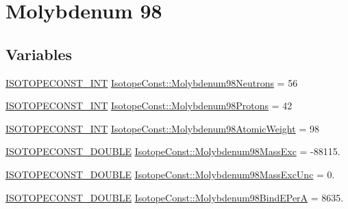 \hypertarget{group___isotope_const-_molybdenum-_mo98}{}\section{Molybdenum 98}
\label{group___isotope_const-_molybdenum-_mo98}
\subsection*{Variables}
\begin{DoxyCompactItemize}
\item 
\mbox{\hyperlink{group___isotope_const-_macros_ga5f18360b3e99483a35c32d789e62621c}{I\+S\+O\+T\+O\+P\+E\+C\+O\+N\+S\+T\+\_\+\+I\+NT}} \mbox{\hyperlink{group___isotope_const-_molybdenum-_mo98_ga6ee229ef1f7830016b0fcb81cb4e545c}{Isotope\+Const\+::\+Molybdenum98\+Neutrons}} = 56
\item 
\mbox{\hyperlink{group___isotope_const-_macros_ga5f18360b3e99483a35c32d789e62621c}{I\+S\+O\+T\+O\+P\+E\+C\+O\+N\+S\+T\+\_\+\+I\+NT}} \mbox{\hyperlink{group___isotope_const-_molybdenum-_mo98_gadfc972fffe1b1a956fc67b76ddd4eefa}{Isotope\+Const\+::\+Molybdenum98\+Protons}} = 42
\item 
\mbox{\hyperlink{group___isotope_const-_macros_ga5f18360b3e99483a35c32d789e62621c}{I\+S\+O\+T\+O\+P\+E\+C\+O\+N\+S\+T\+\_\+\+I\+NT}} \mbox{\hyperlink{group___isotope_const-_molybdenum-_mo98_ga266a6867c988a29695311dd4ae1589e0}{Isotope\+Const\+::\+Molybdenum98\+Atomic\+Weight}} = 98
\item 
\mbox{\hyperlink{group___isotope_const-_macros_ga8f45a7272ce02c0b4c65c44636ed719a}{I\+S\+O\+T\+O\+P\+E\+C\+O\+N\+S\+T\+\_\+\+D\+O\+U\+B\+LE}} \mbox{\hyperlink{group___isotope_const-_molybdenum-_mo98_gafe9fba3c40a0e36539adb8423de960fb}{Isotope\+Const\+::\+Molybdenum98\+Mass\+Exc}} = -\/88115.
\item 
\mbox{\hyperlink{group___isotope_const-_macros_ga8f45a7272ce02c0b4c65c44636ed719a}{I\+S\+O\+T\+O\+P\+E\+C\+O\+N\+S\+T\+\_\+\+D\+O\+U\+B\+LE}} \mbox{\hyperlink{group___isotope_const-_molybdenum-_mo98_gaacaa62d6eec2f1dcc1e7df5aa36f723a}{Isotope\+Const\+::\+Molybdenum98\+Mass\+Exc\+Unc}} = 0.
\item 
\mbox{\hyperlink{group___isotope_const-_macros_ga8f45a7272ce02c0b4c65c44636ed719a}{I\+S\+O\+T\+O\+P\+E\+C\+O\+N\+S\+T\+\_\+\+D\+O\+U\+B\+LE}} \mbox{\hyperlink{group___isotope_const-_molybdenum-_mo98_ga00c1cb41c84e65925a71db52801b49d9}{Isotope\+Const\+::\+Molybdenum98\+Bind\+E\+PerA}} = 8635.
\item 

\end{DoxyCompactItemize}
